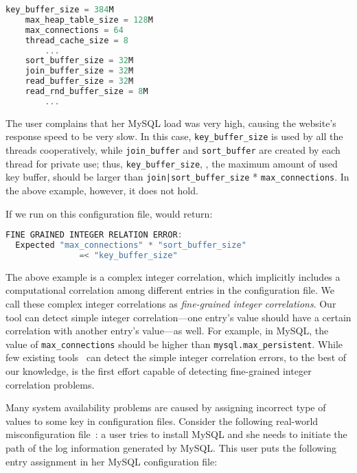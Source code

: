 \begin{lstlisting}[language=C, xleftmargin=.01\textwidth]
    key_buffer_size = 384M
    max_heap_table_size = 128M
    max_connections = 64
    thread_cache_size = 8
        ...
    sort_buffer_size = 32M
    join_buffer_size = 32M
    read_buffer_size = 32M
    read_rnd_buffer_size = 8M
        ...
\end{lstlisting} 

The user complains that her MySQL load was very high, 
causing the website's
response speed to be very slow.
In this case, {\tt key\_buffer\_size} is used by all the threads
cooperatively, while {\tt join\_buffer} and {\tt sort\_buffer} are 
created by each thread for private use; thus, {\tt key\_buffer\_size},
\ie, the maximum amount of used key buffer, should be larger than 
{\tt join|sort\_buffer\_size} * {\tt max\_connections}. 
In the above example, however, it does not hold. 

If we run \app on this configuration file, \app  would return:

\begin{lstlisting}[language=C, xleftmargin=.01\textwidth]
  FINE GRAINED INTEGER RELATION ERROR:
  Expected "max_connections" * "sort_buffer_size"
               =< "key_buffer_size"
\end{lstlisting} 

The above example is a complex integer correlation, which implicitly
includes a computational correlation among different entries
in the configuration file.
We call these complex integer correlations as 
{\em fine-grained integer correlations}. 
Our tool can detect simple integer correlation---one entry's
value should have a certain correlation with another entry's 
value---as well.
For example, in MySQL, the value of {\tt max\_connections} 
should be higher than {\tt mysql.max\_persistent}.
While few existing tools~\cite{yin11anempirical, zhang14encore}
can detect the simple integer correlation errors,
to the best of our knowledge, \app is the first effort capable of
detecting fine-grained integer correlation problems.

Many system availability problems are caused by 
assigning incorrect type of values to some key in configuration
files. Consider the following real-world misconfiguration
file~\cite{typeerror}: 
a user tries to install MySQL and she needs to initiate the path
of the log information generated by MySQL.
This user puts the following entry assignment in her MySQL
configuration file: 

